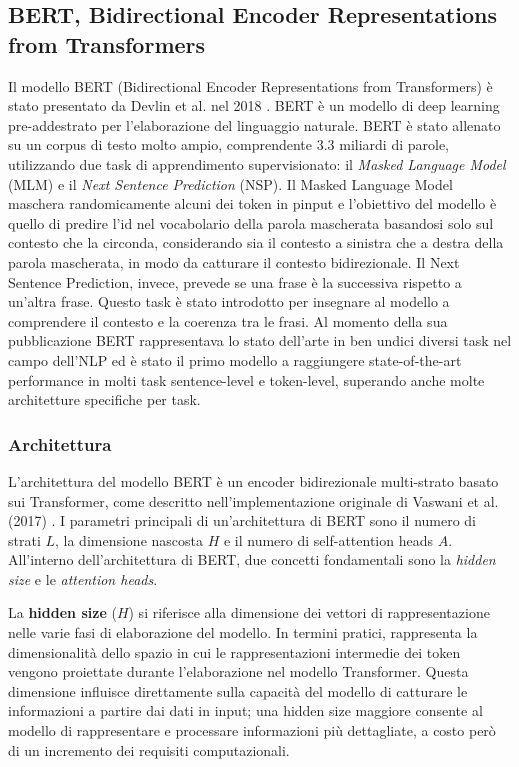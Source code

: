 \documentclass[../../Thesis.tex]{subfiles}
\begin{document}
\subsection{BERT, Bidirectional Encoder Representations from Transformers}
Il modello BERT (Bidirectional Encoder Representations from Transformers) è stato presentato da Devlin et al. nel 2018 \cite{BERT}. BERT è un modello di deep learning pre-addestrato per l'elaborazione del linguaggio naturale. BERT è stato allenato su un corpus di testo molto ampio, comprendente 3.3 miliardi di parole, utilizzando due task di apprendimento supervisionato: il \emph{Masked Language Model} (MLM) e il \emph{Next Sentence Prediction} (NSP). Il Masked Language Model maschera randomicamente alcuni dei token in pinput e l'obiettivo del modello è quello di predire l'id nel vocabolario della parola mascherata basandosi solo sul contesto che la circonda, considerando sia il contesto a sinistra che a destra della parola mascherata, in modo da catturare il contesto bidirezionale. Il Next Sentence Prediction, invece, prevede se una frase è la successiva rispetto a un'altra frase. Questo task è stato introdotto per insegnare al modello a comprendere il contesto e la coerenza tra le frasi. Al momento della sua pubblicazione BERT rappresentava lo stato dell'arte in ben undici diversi task nel campo dell'NLP ed è stato il primo modello a raggiungere state-of-the-art performance in molti task sentence-level e token-level, superando anche molte architetture specifiche per task. 

\subsubsection{Architettura}
L'architettura del modello BERT è un encoder bidirezionale multi-strato basato sui Transformer, come descritto nell'implementazione originale di Vaswani et al. (2017) \cite{AttentionIsAllYouNeed}. I parametri principali di un'architettura di BERT sono il numero di strati $L$, la dimensione nascosta $H$ e il numero di self-attention heads $A$. All'interno dell'architettura di BERT, due concetti fondamentali sono la \textit{hidden size} e le \textit{attention heads}.

La \textbf{hidden size} ($H$) si riferisce alla dimensione dei vettori di rappresentazione nelle varie fasi di elaborazione del modello. In termini pratici, rappresenta la dimensionalità dello spazio in cui le rappresentazioni intermedie dei token vengono proiettate durante l'elaborazione nel modello Transformer. Questa dimensione influisce direttamente sulla capacità del modello di catturare le informazioni a partire dai dati in input; una hidden size maggiore consente al modello di rappresentare e processare informazioni più dettagliate, a costo però di un incremento dei requisiti computazionali.
\end{document}
